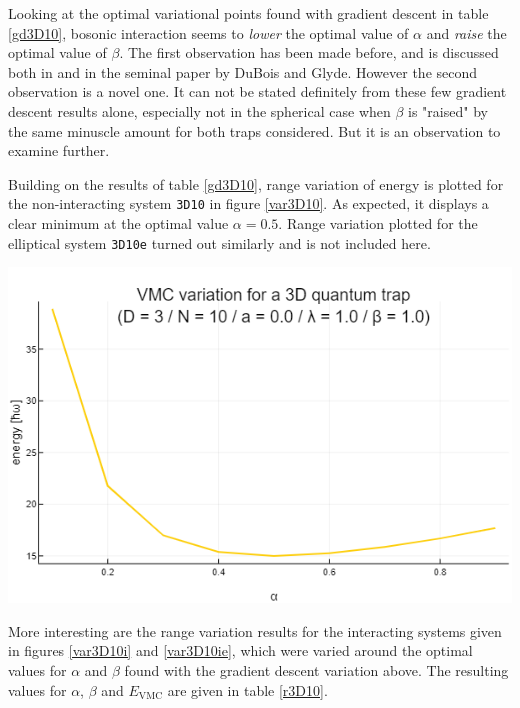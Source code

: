 \documentclass[a4paper,8pt]{article}
\begin{document}
\begin{multicols}{2}
Looking at the optimal variational points found with gradient descent in table \ref{gd3D10}, bosonic interaction seems to \textit{lower} the optimal value of $\alpha$ and \textit{raise} the optimal value of $\beta$. The first observation has been made before, and is discussed both in \cite{SWL} and in the seminal paper \cite{DBG} by DuBois and Glyde. However the second observation is a novel one. It can not be stated definitely from these few gradient descent results alone, especially not in the spherical case when $\beta$ is "raised" by the same minuscle amount for both traps considered. But it is an observation to examine further.

Building on the results of table \ref{gd3D10}, range variation of energy is plotted for the non-interacting system \texttt{3D10} in figure \ref{var3D10}. As expected, it displays a clear minimum at the optimal value $\alpha = 0.5$. Range variation plotted for the elliptical system \texttt{3D10e} turned out similarly and is not included here. 

\begin{center}
\includegraphics[width=0.9\columnwidth]{fig3D10_variation}
\label{var3D10}
\end{center}

More interesting are the range variation results for the interacting systems given in figures \ref{var3D10i} and \ref{var3D10ie}, which were varied around the optimal values for $\alpha$ and $\beta$ found with the gradient descent variation above. The resulting values for $\alpha$, $\beta$ and $E_\text{VMC}$ are given in table \ref{r3D10}.


\end{multicols}
\end{document}
